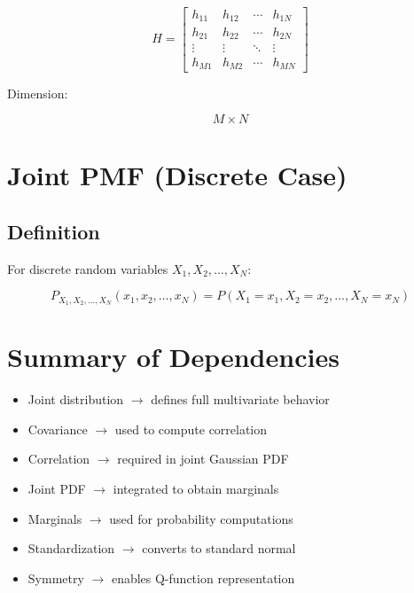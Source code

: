 \documentclass[11pt]{article}
\begin{document}
\[
H =
\begin{bmatrix}
h_{11} & h_{12} & \cdots & h_{1N} \\
h_{21} & h_{22} & \cdots & h_{2N} \\
\vdots & \vdots & \ddots & \vdots \\
h_{M1} & h_{M2} & \cdots & h_{MN}
\end{bmatrix}
\]

Dimension:

\[
M \times N
\]

\section{Joint PMF (Discrete Case)}

\subsection{Definition}

For discrete random variables $X_1, X_2, \ldots, X_N$:

\[
P_{X_1,X_2,\ldots,X_N}(x_1,x_2,\ldots,x_N)
=
P(X_1=x_1, X_2=x_2, \ldots, X_N=x_N)
\]

\section{Summary of Dependencies}

\begin{itemize}[noitemsep]
\item Joint distribution $\rightarrow$ defines full multivariate behavior
\item Covariance $\rightarrow$ used to compute correlation
\item Correlation $\rightarrow$ required in joint Gaussian PDF
\item Joint PDF $\rightarrow$ integrated to obtain marginals
\item Marginals $\rightarrow$ used for probability computations
\item Standardization $\rightarrow$ converts to standard normal
\item Symmetry $\rightarrow$ enables Q-function representation
\end{itemize}
\end{document}
